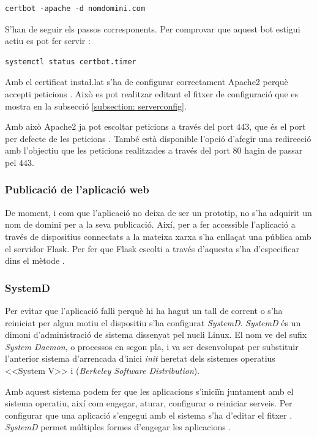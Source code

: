 \documentclass{tfgitic}[2022/06/30]
\begin{document}
\begin{lstlisting}[style = bash]
certbot -apache -d nomdomini.com
\end{lstlisting}

S'han de seguir els passos corresponents. Per comprovar que aquest bot estigui actiu es pot fer servir :

\begin{lstlisting}[style = bash]
systemctl status certbot.timer
\end{lstlisting}

Amb el certificat  insta\l.lat s'ha de configurar correctament Apache2 perquè accepti peticions . Això es pot realitzar editant el fitxer de configuració  que es mostra en la subsecció \ref{subsection: serverconfig}.

Amb això Apache2 ja pot escoltar peticions a través del port $443$, que és el port per defecte de les peticions . També està disponible l'opció d'afegir una redirecció amb l'objectiu que les peticions realitzades a través del port $80$ hagin de passar pel $443$.

\subsubsection{Publicació de l'aplicació web}
De moment, i com que l'aplicació no deixa de ser un prototip, no s'ha adquirit un nom de domini per a la seva publicació. Així, per a fer accessible l'aplicació a través de dispositius connectats a la mateixa xarxa s'ha enllaçat una  pública amb el servidor Flask. Per fer que Flask escolti a través d'aquesta  s'ha d'especificar dins el mètode .

\subsubsection{SystemD}
Per evitar que l'aplicació falli perquè hi ha hagut un tall de corrent o s'ha reiniciat per algun motiu el dispositiu s'ha configurat \emph{SystemD}. \emph{SystemD} és un dimoni d'administració de sistema dissenyat pel nucli Linux. El nom ve del sufix \emph{System Daemon}, o processos en segon pla, i va ser desenvolupat per substituir l'anterior sistema d'arrencada d'inici \emph{init} heretat dels sistemes operatius <<System V>> i  (\emph{Berkeley Software Distribution}).

Amb aquest sistema podem fer que les aplicacions s'iniciïn juntament amb el sistema operatiu, així com engegar, aturar, configurar o reiniciar serveis. Per configurar que una aplicació s'engegui amb el sistema s'ha d'editar el fitxer . \emph{SystemD} permet múltiples formes d'engegar les aplicacions \cite{linux:systemd}.
\end{document}

